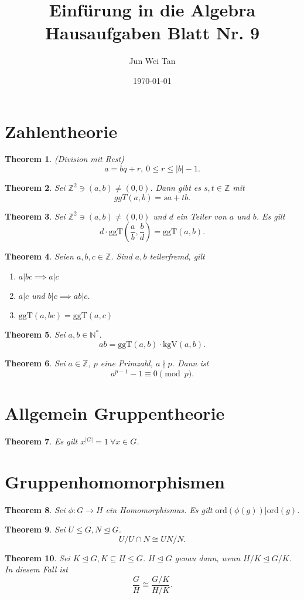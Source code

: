 \documentclass[prb,12pt]{revtex4-2}
\newtheorem{Theorem}{Theorem}
\theoremstyle{definition}
\theoremstyle{definition}
\newenvironment{parts}{\begin{enumerate}[label=(\alph*)]}{\end{enumerate}}
\newcommand{\N}{\mathbb{N}}
\newcommand{\Z}{\mathbb{Z}}
\begin{document}
	\title{Einf\"{u}rung in die Algebra Hausaufgaben Blatt Nr. 9}
	\author{Jun Wei Tan}
	\date{\today}
	\maketitle
	\section{Zahlentheorie}
	\begin{Theorem}
		(Division mit Rest)
	\[
	a=bq+r,~0\le r\le |b|-1
	.\] 
\end{Theorem}
\begin{Theorem}
	Sei $\Z^2\ni (a,b)\neq (0,0)$. Dann gibt es $s,t\in \Z$ mit
	\[
	ggT(a,b)=sa+tb
	.\] 
\end{Theorem}
\begin{Theorem}
	Sei $\Z^2\ni (a,b)\neq (0,0)$ und $d$ ein Teiler von $a$ und $b$. Es gilt
	\[
		d\cdot \text{ggT}\left( \frac{a}{b},\frac{b}{d} \right) =\text{ggT}(a,b)
	.\] 
\end{Theorem}
\begin{Theorem}
	Seien $a,b,c\in \Z$. Sind $a,b$ teilerfremd, gilt
	\begin{parts}
		\item $a|bc\implies a|c$ 
		\item $a|c$ und $b|c\implies ab|c$.
		\item $\text{ggT}(a,bc)=\text{ggT}(a,c)$
	\end{parts}
\end{Theorem}
\begin{Theorem}
	Sei $a,b\in \N^*$.
	\[
		ab=\text{ggT}(a,b)\cdot \text{kgV}(a,b)
	.\] 
\end{Theorem}
\begin{Theorem}
	 Sei $a\in \Z$, $p$ eine Primzahl, $a\nmid p$. Dann ist
	 \[
		 a^{p-1}-1\equiv 0\pmod{p}
	 .\] 
\end{Theorem}
	\section{Allgemein Gruppentheorie}
	\begin{Theorem}
		Es gilt $x^{|G|}=1~\forall x\in G$.
	\end{Theorem}
	\section{Gruppenhomomorphismen}
	\begin{Theorem}
		Sei $\phi:G\to H$ ein Homomorphismus. Es gilt $\text{ord}(\phi(g))|\text{ord}(g)$.
	\end{Theorem}
	\begin{Theorem}
		Sei $U\le G,N\trianglelefteq G$. 
		\[
		U / U\cap N \cong UN / N
		.\] 
	\end{Theorem}
	\begin{Theorem}
		Sei $K\trianglelefteq G, K\subseteq H\le G$. $H\trianglelefteq G$ genau dann, wenn $H / K \trianglelefteq G / K$. In diesem Fall ist
		\[
		\frac{G}{H}\cong \frac{G / K}{H / K}
		.\] 
	\end{Theorem}
\end{document}
